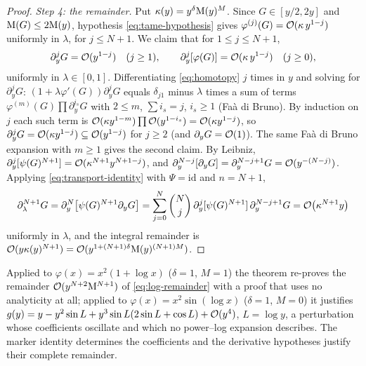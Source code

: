 \begin{proof}
\emph{Step 4: the remainder.} Put $\kappa(y)=y^\delta\mathrm M(y)^M$. Since $G\in[y/2,2y]$ and $\mathrm M(G)\le2\mathrm M(y)$, hypothesis \eqref{eq:tame-hypothesis} gives $\varphi^{(j)}(G)=\mathcal O(\kappa\,y^{1-j})$ uniformly in $\lambda$, for $j\le N+1$. We claim that for $1\le j\le N+1$,
\begin{equation}
 \partial_y^jG=\mathcal O(y^{1-j})\quad(j\ge1),\qquad \partial_y^j[\varphi(G)]=\mathcal O(\kappa\,y^{1-j})\quad(j\ge0),
 \label{eq:derivative-bounds}
\end{equation}
uniformly in $\lambda\in[0,1]$. Differentiating \eqref{eq:homotopy} $j$ times in $y$ and solving for $\partial_y^jG$: $(1+\lambda\varphi'(G))\partial_y^jG$ equals $\delta_{j1}$ minus $\lambda$ times a sum of terms $\varphi^{(m)}(G)\prod\partial_y^{i_s}G$ with $2\le m$, $\sum i_s=j$, $i_s\ge1$ (Fa\`a di Bruno). By induction on $j$ each such term is $\mathcal O(\kappa y^{1-m})\prod\mathcal O(y^{1-i_s})=\mathcal O(\kappa y^{1-j})$, so $\partial_y^jG=\mathcal O(\kappa y^{1-j})\subseteq\mathcal O(y^{1-j})$ for $j\ge2$ (and $\partial_yG=\mathcal O(1)$). The same Fa\`a di Bruno expansion with $m\ge1$ gives the second claim. By Leibniz, $\partial_y^j[\psi(G)^{N+1}]=\mathcal O(\kappa^{N+1}y^{N+1-j})$, and $\partial_y^{N-j}[\partial_yG]=\partial_y^{N-j+1}G=\mathcal O(y^{-(N-j)})$. Applying \eqref{eq:transport-identity} with $\Psi=\mathrm{id}$ and $n=N+1$,
\[
 \partial_\lambda^{N+1}G=\partial_y^N\bigl[\psi(G)^{N+1}\partial_yG\bigr]=\sum_{j=0}^N\binom Nj\,\partial_y^j[\psi(G)^{N+1}]\,\partial_y^{N-j+1}G=\mathcal O\bigl(\kappa^{N+1}y\bigr)
\]
uniformly in $\lambda$, and the integral remainder is $\mathcal O(y\kappa(y)^{N+1})=\mathcal O(y^{1+(N+1)\delta}\mathrm M(y)^{(N+1)M})$.
\end{proof}

\begin{remark}
Applied to $\varphi(x)=x^2(1+\log x)$ ($\delta=1$, $M=1$) the theorem re-proves the remainder $\mathcal O(y^{N+2}\mathrm M^{N+1})$ of \eqref{eq:log-remainder} with a proof that uses no analyticity at all; applied to $\varphi(x)=x^2\sin(\log x)$ ($\delta=1$, $M=0$) it justifies $g(y)=y-y^2\sin L+y^3\sin L(2\sin L+\cos L)+\mathcal O(y^4)$, $L=\log y$, a perturbation whose coefficients oscillate and which no power--log expansion describes. The marker identity determines the coefficients and the derivative hypotheses justify their complete remainder.
\end{remark}
